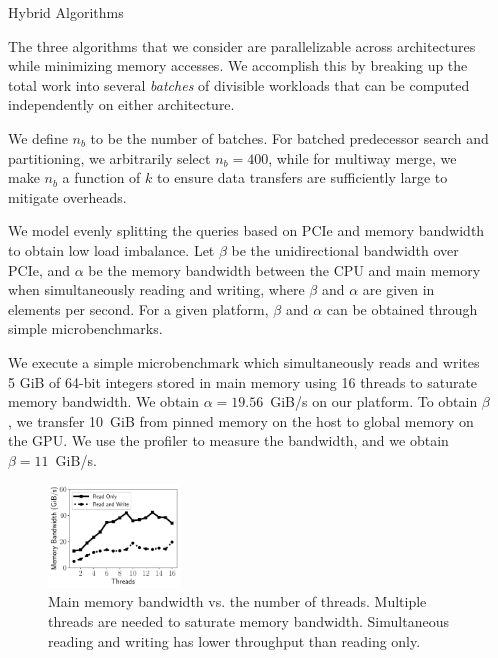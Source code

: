 \documentclass[final]{beamer}
\newlength{\sepwidth}
\newlength{\colwidth}
\newcommand{\separatorcolumn}{\begin{column}{\sepwidth}\end{column}}
\begin{document}
\begin{frame}[t]
\begin{columns}[t]
\separatorcolumn

\begin{column}{\colwidth}

 \begin{block}{Hybrid Algorithms}

 \begin{description}[font=$\bullet$~\normalfont\scshape\color{red!50!black}]
\item The three algorithms that we consider are parallelizable across architectures while minimizing memory accesses. We accomplish this by breaking up the total work into several \emph{batches} of divisible workloads that can be computed independently on either architecture. 

\item We define $n_b$ to be the number of batches. For batched predecessor search and partitioning, we arbitrarily select $n_b=400$, while for multiway merge, we make $n_b$ a function of $k$ to ensure data transfers are sufficiently large to mitigate overheads.

\item We model evenly splitting the queries based on PCIe and memory bandwidth to obtain low load imbalance. Let $\beta$ be the unidirectional bandwidth over PCIe, and $\alpha$ be the memory bandwidth between the CPU and main memory when simultaneously reading and writing, where $\beta$ and $\alpha$ are given in elements per second. For a given platform, $\beta$ and  $\alpha$ can be obtained through simple microbenchmarks.

\item We execute a simple microbenchmark which simultaneously reads and writes 5 GiB of 64-bit integers stored in main memory using 16 threads to saturate memory bandwidth. We obtain $\alpha=19.56$~GiB/s on our platform. To obtain $\beta$, we transfer 10~GiB from pinned memory on the host to global memory on the GPU. We use the profiler to measure the bandwidth, and we obtain $\beta=11$~GiB/s. 



\begin{figure}[htp]
\centering
    \includegraphics[width=0.33\textwidth, trim={0.5cm 0.5cm 0.5cm 1cm}]{figures/microbenchmarks_time_vs_threads.pdf}	
    \caption{Main memory bandwidth vs. the number of threads. Multiple threads are needed to saturate memory bandwidth. Simultaneous reading and writing has lower throughput than reading only.}
   \label{fig:mem_bandwidth_scalability}
\end{figure}


\end{description}
\end{block}
\end{column}
\end{columns}
\end{frame}
\end{document}
